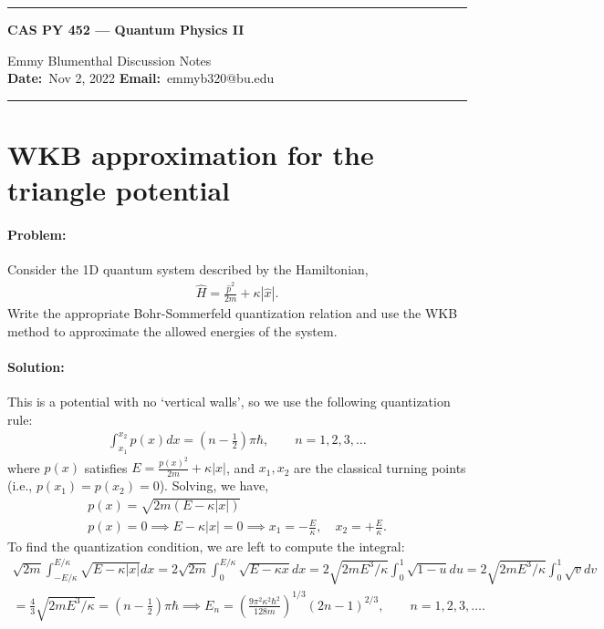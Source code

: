 \documentclass[10pt]{article}
\newcommand{\1}{\mathbf 1}
\begin{document}
\begin{center}
	\hrule
	\vspace{.4cm}
	{\textbf { \large CAS PY 452 --- Quantum Physics II}}
\end{center}
Emmy Blumenthal \hspace{\fill} \hspace{\fill}  \textbf{} Discussion Notes\  \\
\textbf{Date:}\  Nov 2, 2022   \hspace{\fill} \textbf{Email:}\ emmyb320@bu.edu \ 
\vspace{.4cm}
\hrule

\section*{WKB approximation for the triangle potential}


\paragraph{Problem:}

Consider the 1D quantum system described by the Hamiltonian,
\begin{align}
	\hat H =
	\frac{\hat p^2}{2m}
	+
	\kappa |\hat x|.
\end{align}
Write the appropriate Bohr-Sommerfeld quantization relation and use the WKB method to approximate the allowed energies of the system.

\paragraph{Solution:}

This is a potential with no `vertical walls', so we use the following quantization rule:
\begin{align}
	\int_{x_1}^{x_2} p(x) dx = \left(n - \frac{1}{2}\right) \pi \hbar,
	\qquad
	n = 1,2,3,\dots
\end{align}
where $p(x)$ satisfies $E = \frac{p(x)^2}{2m}+ \kappa |x|$, and $x_1,x_2$ are the classical turning points (i.e., $p(x_1) = p(x_2) =0$).
Solving, we have,
\begin{gather}
	p(x) = \sqrt{2m(E - \kappa|x|)}\\
	p(x) = 0
	\implies
	E - \kappa|x| = 0 
	\implies
	x_1 = -\frac{E}{\kappa},
	\quad x_2 = + \frac{E}{\kappa}.
\end{gather}
To find the quantization condition, we are left to compute the integral:
\begin{gather}
	\sqrt{2m}
	\int_{-E/\kappa}^{E/\kappa}
	\sqrt{E - \kappa|x|}
	dx
	=
	2
	\sqrt{2m}
	\int_{0}^{E/\kappa}
	\sqrt{E - \kappa x}
	dx
	=
	2
	\sqrt{2mE^3/\kappa}
	\int_0^{1}
	\sqrt{1 - u} 
	du
	=
	2
	\sqrt{2mE^3/\kappa}
	\int_0^{1}
	\sqrt{v}  
	dv
	\nonumber
	\\
	=
	\frac{4}{3}\sqrt{2mE^3/\kappa}
	=
	\left(n-\frac{1}{2}\right)\pi\hbar
	\implies
	E_n
	=
	\left(
		\frac{9 \pi^2 \kappa^2\hbar^2}{128 m}
	\right)^{1/3}
	(2n-1)^{2/3}
	,\qquad
	n=1,2,3,\dots.
\end{gather}
\end{document}
